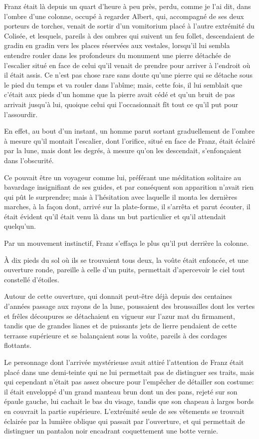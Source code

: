Franz était là depuis un quart d'heure à peu près, perdu, comme je l'ai dit, dans l'ombre d'une colonne, occupé à regarder Albert, qui, accompagné de ses deux porteurs de torches, venait de sortir d'un vomitorium placé à l'autre extrémité du Colisée, et lesquels, pareils à des ombres qui suivent un feu follet, descendaient de gradin en gradin vers les places réservées aux vestales, lorsqu'il lui sembla entendre rouler dans les profondeurs du monument une pierre détachée de l'escalier situé en face de celui qu'il venait de prendre pour arriver à l'endroit où il était assis. Ce n'est pas chose rare sans doute qu'une pierre qui se détache sous le pied du temps et va rouler dans l'abîme; mais, cette fois, il lui semblait que c'était aux pieds d'un homme que la pierre avait cédé et qu'un bruit de pas arrivait jusqu'à lui, quoique celui qui l'occasionnait fît tout ce qu'il put pour l'assourdir. 

En effet, au bout d'un instant, un homme parut sortant graduellement de l'ombre à mesure qu'il montait l'escalier, dont l'orifice, situé en face de Franz, était éclairé par la lune, mais dont les degrés, à mesure qu'on les descendait, s'enfonçaient dans l'obscurité. 

Ce pouvait être un voyageur comme lui, préférant une méditation solitaire au bavardage insignifiant de ses guides, et par conséquent son apparition n'avait rien qui pût le surprendre; mais à l'hésitation avec laquelle il monta les dernières marches, à la façon dont, arrivé sur la plate-forme, il s'arrêta et parut écouter, il était évident qu'il était venu là dans un but particulier et qu'il attendait quelqu'un. 

Par un mouvement instinctif, Franz s'effaça le plus qu'il put derrière la colonne. 

À dix pieds du sol où ils se trouvaient tous deux, la voûte était enfoncée, et une ouverture ronde, pareille à celle d'un puits, permettait d'apercevoir le ciel tout constellé d'étoiles. 

Autour de cette ouverture, qui donnait peut-être déjà depuis des centaines d'années passage aux rayons de la lune, poussaient des broussailles dont les vertes et frêles découpures se détachaient en vigueur sur l'azur mat du firmament, tandis que de grandes lianes et de puissants jets de lierre pendaient de cette terrasse supérieure et se balançaient sous la voûte, pareils à des cordages flottants. 

Le personnage dont l'arrivée mystérieuse avait attiré l'attention de Franz était placé dans une demi-teinte qui ne lui permettait pas de distinguer ses traits, mais qui cependant n'était pas assez obscure pour l'empêcher de détailler son costume: il était enveloppé d'un grand manteau brun dont un des pans, rejeté sur son épaule gauche, lui cachait le bas du visage, tandis que son chapeau à larges bords en couvrait la partie supérieure. L'extrémité seule de ses vêtements se trouvait éclairée par la lumière oblique qui passait par l'ouverture, et qui permettait de distinguer un pantalon noir encadrant coquettement une botte vernie. 

